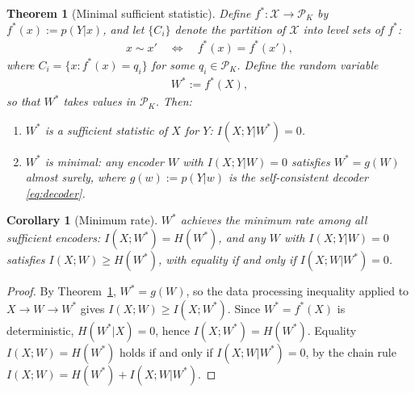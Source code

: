 \documentclass[10pt,a4paper]{amsart}
\newtheorem{theorem}{Theorem}
\newtheorem{corollary}{Corollary}
\begin{document}
\begin{theorem}[Minimal sufficient statistic]
\label{thm:mss}
Define $f^*:\mathcal{X}\to\mathcal{P}_K$ by $f^*(x):=p(Y|x)$, and let
$\{C_i\}$ denote the partition of $\mathcal{X}$ into level sets of $f^*$:
\begin{align}
    x \sim x' \quad \Longleftrightarrow \quad f^*(x)=f^*(x'),
    \label{eq:equiv}
\end{align}
where $C_i=\{x:f^*(x)=q_i\}$ for some $q_i\in\mathcal{P}_K$.
Define the random variable
\begin{align}
    W^* := f^*(X),
    \label{eq:mss}
\end{align}
so that $W^*$ takes values in $\mathcal{P}_K$. Then:
\begin{enumerate}
    \item $W^*$ is a sufficient statistic of $X$ for $Y$:
    $I(X;Y|W^*)=0$.
    \item $W^*$ is minimal: any encoder $W$ with $I(X;Y|W)=0$
    satisfies $W^*=g(W)$ almost surely, where $g(w):=p(Y|w)$ is the
    self-consistent decoder \eqref{eq:decoder}.
\end{enumerate}
\end{theorem}

\begin{corollary}[Minimum rate]
\label{cor:min_rate}
$W^*$ achieves the minimum rate among all sufficient encoders:
$I(X;W^*)=H(W^*)$, and any $W$ with $I(X;Y|W)=0$ satisfies
$I(X;W)\geq H(W^*)$, with equality if and only if $I(X;W|W^*)=0$.
\end{corollary}

\begin{proof}
By Theorem~\ref{thm:mss}, $W^*=g(W)$, so the data processing
inequality applied to $X\to W\to W^*$ gives
$I(X;W)\geq I(X;W^*)$.
Since $W^*=f^*(X)$ is deterministic, $H(W^*|X)=0$, hence
$I(X;W^*)=H(W^*)$.
Equality $I(X;W)=H(W^*)$ holds if and only if $I(X;W|W^*)=0$,
by the chain rule $I(X;W)=H(W^*)+I(X;W|W^*)$.
\end{proof}
\end{document}
